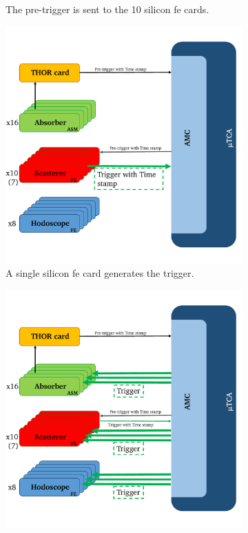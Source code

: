 \begin{figure}
\begin{subfigure}[b]{0.5\textwidth}
\caption[Pre-trigger sent to the 10 silicon \gls{fe} cards.]{The pre-trigger is sent to the 10 silicon \gls{fe} cards.}
\label{chapappA::subfig::triggerLogic_3}
\end{subfigure}%
\begin{subfigure}[b]{0.5\textwidth}
 \centering
\includegraphics[width=0.9\linewidth]{03_GraphicFiles/appendixA_dataFormat/triggerLogic_4.pdf}
\caption[A single silicon \gls{fe} card generates the trigger.]{A single silicon \gls{fe} card generates the trigger.}
\label{chapappA::subfig::triggerLogic_4}
\end{subfigure}%
\newline
\begin{subfigure}[b]{0.5\textwidth}
 \centering
\includegraphics[width=0.9\linewidth]{03_GraphicFiles/appendixA_dataFormat/triggerLogic_5.pdf}

\end{subfigure}
\end{figure}
